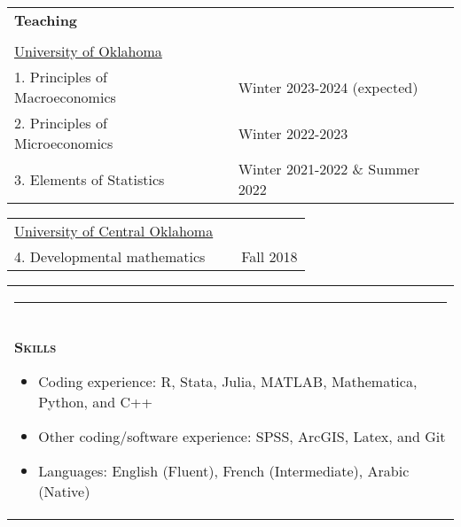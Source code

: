 \documentclass[10pt,letterpaper]{article}
\begin{document}
\begin{tabular}{p{3.25in}p{1.5in}p{6.25in}}

{\textbf{\large{Teaching }}} &\\
\\
\underline{University of Oklahoma }                        &                   & \vspace{0.25 cm}\\
1.  Principles of Macroeconomics             &               & Winter 2023-2024 (expected)\\
2.  Principles of Microeconomics             &               & Winter 2022-2023\\
3. Elements of Statistics             &               & Winter 2021-2022 \& Summer 2022\\

\end{tabular}


\begin{tabular}{p{3.25in}p{1.5in}p{6.25in}}
\underline{University of Central Oklahoma}                       &                    & \vspace{0.25 cm}\\
4.  Developmental mathematics                  &              & Fall 2018 \\

\end{tabular}


\begin{tabular}{p{7.5in}}
\multicolumn{3}{p{7.5in}}{\hrule}\\[1ex]

	{\large \textsc{\textbf{\large{Skills}}}}
	\begin{itemize}
    \item Coding experience: R, Stata, Julia, MATLAB, Mathematica, Python, and C++
    \item Other coding/software experience: SPSS, ArcGIS, Latex, and Git
    \item Languages: English (Fluent), French (Intermediate), Arabic (Native)
	\end{itemize}

	\\
\end{tabular}






\end{document}
